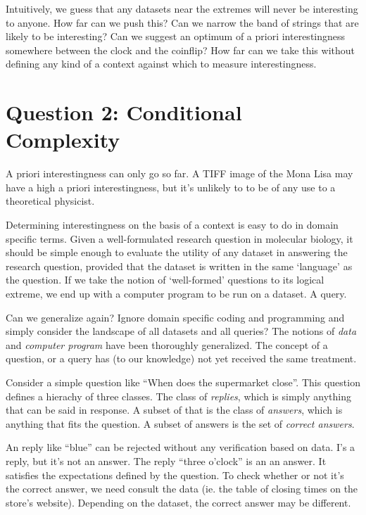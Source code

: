 \documentclass{article}
\begin{document}
Intuitively, we guess that any datasets near the extremes will never be
interesting to anyone. How far can we push this? Can we narrow the band of
strings that are likely to be interesting? Can we suggest an optimum of a priori
interestingness somewhere between the clock and the coinflip? How far can we
take this without defining any kind of a context against which to measure
interestingness.

\section*{Question 2: Conditional Complexity}

A priori interestingness can only go so far. A TIFF image of the Mona Lisa
may have a high a priori interestingness, but it's unlikely to to be of any use
to a theoretical physicist. 

Determining interestingness on the basis of a context is easy to do in domain
specific terms. Given a well-formulated research question in molecular biology,
it should be simple enough to evaluate the utility of any dataset in answering
the research question, provided that the dataset is written in the same
`language' as the question. If we take the notion of `well-formed' questions to
its logical extreme, we end up with a computer program to be run on a dataset. A
query.

Can we generalize again? Ignore domain specific coding and programming and
simply consider the landscape of all datasets and all queries? The notions of
\emph{data} and \emph{computer program} have been thoroughly generalized. The
concept of a question, or a query has (to our knowledge) not yet received the
same treatment.

Consider a simple question like ``When does the supermarket close''. This question defines a hierachy of three classes. The class of \emph{replies}, which is simply anything that can be said in response. A subset of that is the class of \emph{answers}, which is anything that fits the question. A subset of answers is the set of \emph{correct answers}.

An reply like ``blue'' can be rejected without any verification based on data. I's a reply, but it's not an answer. The reply ``three o'clock'' is an an answer. It satisfies the expectations defined by the question. To check whether or not it's the correct answer, we need consult the data (ie. the table of closing times on the store's website). Depending on the dataset, the correct answer may be different.
\end{document}
